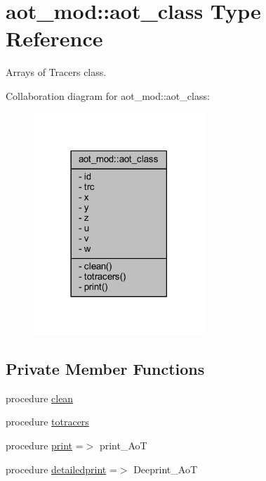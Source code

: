 \hypertarget{structaot__mod_1_1aot__class}{}\section{aot\+\_\+mod\+:\+:aot\+\_\+class Type Reference}
\label{structaot__mod_1_1aot__class}


Arrays of Tracers class.  




Collaboration diagram for aot\+\_\+mod\+:\+:aot\+\_\+class\+:\nopagebreak
\begin{figure}[H]
\begin{center}
\leavevmode
\includegraphics[width=182pt]{structaot__mod_1_1aot__class__coll__graph}
\end{center}
\end{figure}
\subsection*{Private Member Functions}
\begin{DoxyCompactItemize}
\item 
procedure \mbox{\hyperlink{structaot__mod_1_1aot__class_aab1eb00e5cd2868ff08fcd5bb1529688}{clean}}
\item 
procedure \mbox{\hyperlink{structaot__mod_1_1aot__class_a834962484645337446945ae834ea5293}{totracers}}
\item 
procedure \mbox{\hyperlink{structaot__mod_1_1aot__class_a92925f914d4cc5f252e4ca638e104628}{print}} =$>$ print\+\_\+\+AoT
\item 
procedure \mbox{\hyperlink{structaot__mod_1_1aot__class_a9e102da285babd08bff501efbe3b3b10}{detailedprint}} =$>$ Deeprint\+\_\+\+AoT
\end{DoxyCompactItemize}
